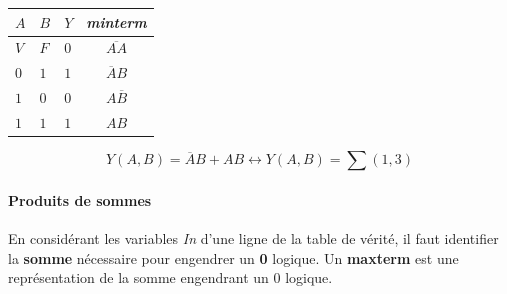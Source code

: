 \documentclass{report}
\begin{document}
\begin{multicols*}{3}
                \begin{table}[H]
                  \begin{center}
                   \renewcommand{\arraystretch}{1.5}
                    \footnotesize
                        \begin{tabular}{|l|l|l||c|}
                        \arrayrulecolor{blue}\hline
                        \rowcolor{lightBlue}
                        \textcolor{myb}{$A$} & \textcolor{myb}{$B$} 
                                           & \textcolor{myb}{$Y$} 
                                           & \textcolor{myb}{\textit{minterm}}  
                        \\
                        \hline
                        \hline
                        \arrayrulecolor{black}
                        $V$ & $F$ & \cellcolor{myr} $0$ & $\overline{AA}$
                        \\
                        \hline
                        $0$ & $1$ & \cellcolor{myg} $1$ & \textcolor{myg}{$\overline{A}B$}
                        \\
                        \hline 
                        $1$ & $0$ & \cellcolor{myr} $0$ & $A\overline{B}$ 
                        \\ 
                        \hline
                        $1$ & $1$ & \cellcolor{myg} $1$ & \textcolor{myg}{$AB$}
                        \\
                        \hline
                        \end{tabular}
                \end{center}
                \end{table}
                \[Y(A, B) = \overline{A}B + AB \leftrightarrow Y(A,B) = \sum (1, 3) \]
    

    \paragraph{Produits de sommes}
    En considérant les variables \textit{In} d'une ligne de la table de vérité, 
    il faut identifier la \textbf{somme} nécessaire 
    pour engendrer un \textbf{0} logique. Un \textbf{maxterm} est une 
    représentation de la somme engendrant un 0 logique. 



\end{multicols*}
\end{document}
